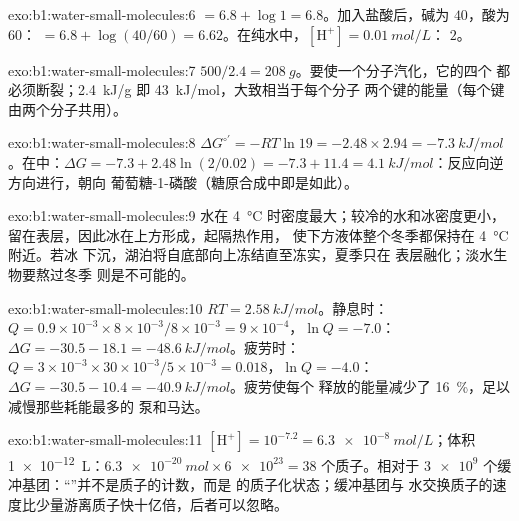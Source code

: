 \begin{solution}{exo:b1:water-small-molecules:6}
 $= 6.8 + \log 1 = 6.8$。加入盐酸后，碱为 $40$，酸为 $60$： $= 6.8 +
\log(40/60) = 6.62$。在纯水中，$[\mathrm{H^+}] = \qty{0.01}{mol/L}$：
 $2$。
\end{solution}

\begin{solution}{exo:b1:water-small-molecules:7}
$500/2.4 = \qty{208}{g}$。要使一个分子汽化，它的四个
都必须断裂；\qty{2.4}{kJ/g} 即 \qty{43}{kJ/mol}，大致相当于每个分子
两个键的能量（每个键由两个分子共用）。
\end{solution}

\begin{solution}{exo:b1:water-small-molecules:8}
$\Delta G^{\circ\prime} = -RT\ln 19 = -2.48\times 2.94 =
\qty{-7.3}{kJ/mol}$。在中：$\Delta G = -7.3 + 2.48\ln(2/0.02) =
-7.3 + 11.4 = \qty{+4.1}{kJ/mol}$：反应向逆方向进行，朝向
葡萄糖-1-磷酸（糖原合成中即是如此）。
\end{solution}

\begin{solution}{exo:b1:water-small-molecules:9}
水在 \qty{4}{\celsius} 时密度最大；较冷的水和冰密度更小，
留在表层，因此冰在上方形成，起隔热作用，
使下方液体整个冬季都保持在 \qty{4}{\celsius} 附近。若冰
下沉，湖泊将自底部向上冻结直至冻实，夏季只在
表层融化；淡水生物要熬过冬季
则是不可能的。
\end{solution}

\begin{solution}{exo:b1:water-small-molecules:10}
$RT = \qty{2.58}{kJ/mol}$。静息时：$Q = 0.9\times 10^{-3}\times 8\times
10^{-3}/8\times 10^{-3} = 9\times 10^{-4}$，$\ln Q = -7.0$：$\Delta G =
-30.5 - 18.1 = \qty{-48.6}{kJ/mol}$。疲劳时：$Q = 3\times 10^{-3}\times
30\times 10^{-3}/5\times 10^{-3} = 0.018$，$\ln Q = -4.0$：$\Delta G =
-30.5 - 10.4 = \qty{-40.9}{kJ/mol}$。疲劳使每个  释放的能量减少了
\qty{16}{\%}，足以减慢那些耗能最多的
泵和马达。
\end{solution}

\begin{solution}{exo:b1:water-small-molecules:11}
$[\mathrm{H^+}] = 10^{-7.2} = \qty{6.3e-8}{mol/L}$；体积
\qty{1e-12}{L}：$\qty{6.3e-20}{mol}\times\num{6e23} = 38$ 个质子。相对于
$\num{3e9}$ 个缓冲基团：“”并不是质子的计数，而是
的质子化状态；缓冲基团与
水交换质子的速度比少量游离质子快十亿倍，后者可以忽略。
\end{solution}

